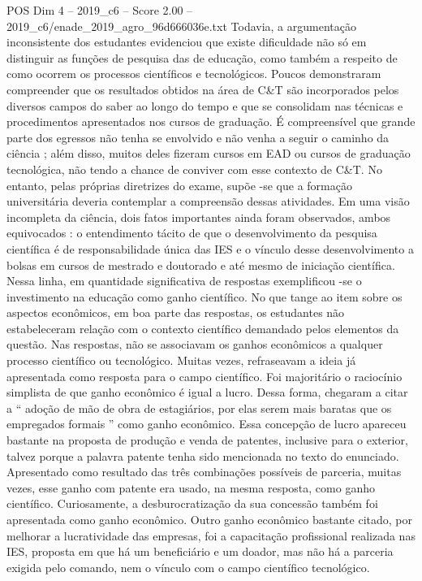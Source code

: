 \begin{textsample}{POS Dim 4 – 2019\_c6 – Score 2.00 – 2019\_c6/enade\_2019\_agro\_96d666036e.txt}
Todavia, a argumentação inconsistente dos estudantes evidenciou que existe dificuldade não só em distinguir as funções de pesquisa das de educação, como também a respeito de como ocorrem os processos científicos e tecnológicos.
Poucos demonstraram compreender que os resultados obtidos na área de C\&T são incorporados pelos diversos campos do saber ao longo do tempo e que se consolidam nas técnicas e procedimentos apresentados nos cursos de graduação.
É compreensível que grande parte dos egressos não tenha se envolvido e não venha a seguir o caminho da ciência ; além disso, muitos deles fizeram cursos em EAD ou cursos de graduação tecnológica, não tendo a chance de conviver com esse contexto de C\&T.
No entanto, pelas próprias diretrizes do exame, supõe -se que a formação universitária deveria contemplar a compreensão dessas atividades.
Em uma visão incompleta da ciência, dois fatos importantes ainda foram observados, ambos equivocados : o entendimento tácito de que o desenvolvimento da pesquisa científica é de responsabilidade única das IES e o vínculo desse desenvolvimento a bolsas em cursos de mestrado e doutorado e até mesmo de iniciação científica.
Nessa linha, em quantidade significativa de respostas exemplificou -se o investimento na educação como ganho científico.
No que tange ao item sobre os aspectos econômicos, em boa parte das respostas, os estudantes não estabeleceram relação com o contexto científico demandado pelos elementos da questão.
Nas respostas, não se associavam os ganhos econômicos a qualquer processo científico ou tecnológico.
Muitas vezes, refraseavam a ideia já apresentada como resposta para o campo científico.
Foi majoritário o raciocínio simplista de que ganho econômico é igual a lucro.
Dessa forma, chegaram a citar a “ adoção de mão de obra de estagiários, por elas serem mais baratas que os empregados formais ” como ganho econômico.
Essa concepção de lucro apareceu bastante na proposta de produção e venda de patentes, inclusive para o exterior, talvez porque a palavra patente tenha sido mencionada no texto do enunciado.
Apresentado como resultado das três combinações possíveis de parceria, muitas vezes, esse ganho com patente era usado, na mesma resposta, como ganho científico.
Curiosamente, a desburocratização da sua concessão também foi apresentada como ganho econômico.
Outro ganho econômico bastante citado, por melhorar a lucratividade das empresas, foi a capacitação profissional realizada nas IES, proposta em que há um beneficiário e um doador, mas não há a parceria exigida pelo comando, nem o vínculo com o campo científico tecnológico.

\end{textsample}
